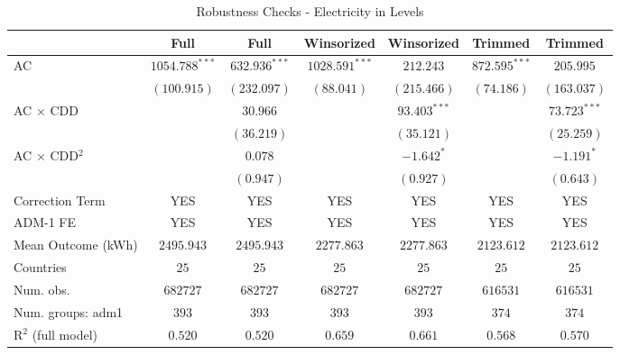 
\begin{table}[H]
\caption{Robustness Checks - Electricity in Levels}
\begin{center}
\begin{tabular}{l c c c c c c}
\hline
 & Full & Full & Winsorized & Winsorized & Trimmed & Trimmed \\
\hline
AC                      & $1054.788^{***}$ & $632.936^{***}$ & $1028.591^{***}$ & $212.243$      & $872.595^{***}$ & $205.995$      \\
                        & $(100.915)$      & $(232.097)$     & $(88.041)$       & $(215.466)$    & $(74.186)$      & $(163.037)$    \\
AC $\times$ CDD         &                  & $30.966$        &                  & $93.403^{***}$ &                 & $73.723^{***}$ \\
                        &                  & $(36.219)$      &                  & $(35.121)$     &                 & $(25.259)$     \\
AC $\times$ CDD$^2$     &                  & $0.078$         &                  & $-1.642^{*}$   &                 & $-1.191^{*}$   \\
                        &                  & $(0.947)$       &                  & $(0.927)$      &                 & $(0.643)$      \\
\hline
Correction Term         & YES              & YES             & YES              & YES            & YES             & YES            \\
ADM-1 FE                & YES              & YES             & YES              & YES            & YES             & YES            \\
Mean Outcome (kWh)      & $2495.943$       & $2495.943$      & $2277.863$       & $2277.863$     & $2123.612$      & $2123.612$     \\
Countries               & $25$             & $25$            & $25$             & $25$           & $25$            & $25$           \\
Num. obs.               & $682727$         & $682727$        & $682727$         & $682727$       & $616531$        & $616531$       \\
Num. groups: adm1       & $393$            & $393$           & $393$            & $393$          & $374$           & $374$          \\
R$^2$ (full model)      & $0.520$          & $0.520$         & $0.659$          & $0.661$        & $0.568$         & $0.570$        \\

\end{tabular}
\end{center}
\end{table}
